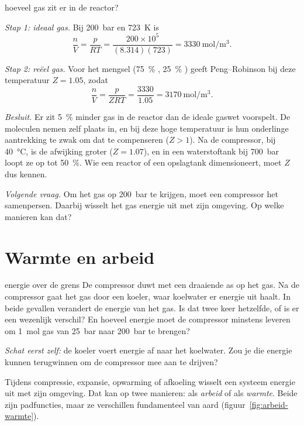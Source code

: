 \begin{casusuitgewerkt}{hoeveel gas zit er in de reactor?}

\emph{Stap 1: ideaal gas.} Bij \SI{200}{\bar} en \SI{723}{\kelvin} is
\[
\frac{n}{V} = \frac{p}{RT} = \frac{200\times10^{5}}{(8.314)(723)} = \SI{3330}{\mole\per\metre\cubed}.
\]

\emph{Stap 2: re\"eel gas.} Voor het mengsel (\SI{75}{\percent} , \SI{25}{\percent} ) geeft Peng--Robinson bij deze temperatuur $Z = 1.05$, zodat
\[
\frac{n}{V} = \frac{p}{ZRT} = \frac{3330}{1.05} = \SI{3170}{\mole\per\metre\cubed}.
\]

\emph{Besluit.} Er zit \SI{5}{\percent} minder gas in de reactor dan de ideale gaswet voorspelt. De moleculen nemen zelf plaats in, en bij deze hoge temperatuur is hun onderlinge aantrekking te zwak om dat te compenseren ($Z > 1$). Na de compressor, bij \SI{40}{\celsius}, is de afwijking groter ($Z = 1.07$), en in een waterstoftank bij \SI{700}{\bar} loopt ze op tot \SI{50}{\percent}. Wie een reactor of een opslagtank dimensioneert, moet $Z$ dus kennen.

\emph{Volgende vraag.} Om het gas op \SI{200}{\bar} te krijgen, moet een compressor het samenpersen. Daarbij wisselt het gas energie uit met zijn omgeving. Op welke manieren kan dat?
\end{casusuitgewerkt}

\section{Warmte en arbeid}

\begin{casus}{energie over de grens}
De compressor duwt met een draaiende as op het gas. Na de compressor gaat het gas door een koeler, waar koelwater er energie uit haalt. In beide gevallen verandert de energie van het gas. Is dat twee keer hetzelfde, of is er een wezenlijk verschil? En hoeveel energie moet de compressor minstens leveren om \SI{1}{\mole} gas van \SI{25}{\bar} naar \SI{200}{\bar} te brengen?

\emph{Schat eerst zelf:} de koeler voert energie af naar het koelwater. Zou je die energie kunnen terugwinnen om de compressor mee aan te drijven?
\end{casus}

Tijdens compressie, expansie, opwarming of afkoeling wisselt een systeem energie uit met zijn omgeving. Dat kan op twee manieren: als \emph{arbeid} of als \emph{warmte}. Beide zijn padfuncties, maar ze verschillen fundamenteel van aard (figuur~\ref{fig:arbeid-warmte}).

